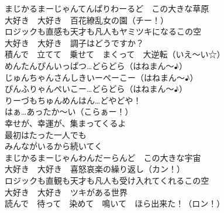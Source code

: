 {まじかるまーじゃんてんぱりわーるど　この大きな草原\\
大好き　大好き　百花繚乱女の園（チー！）\\
ロジックも直感も天才も凡人もヤミツキになるこの空\\
大好き　大好き　調子はどうですか？\\
積んで　立てて　乗せて　まくって　大逆転（いえ〜い☆）\\

めんたんぴんいっぱつ…どらどら（はねまん〜♪）\\
じゅんちゃんさんしきいーぺーこー（はねまん〜♪）\\
ぴんふりゃんぺいこー…どらどら（はねまん〜♪）\\
りーづもちゅんめんはん…どやどや！\\
はぁ…あったか〜い（こらぁー！）\\

幸せが、幸運が、集まってくるよ\\
最初はたった一人でも\\
みんながいるから続いてく\\

まじかるまーじゃんわんだーらんど　この大きな宇宙\\
大好き　大好き　喜怒哀楽の繰り返し（カン！）\\
ロジックも直観も天才も凡人も受け入れてくれるこの空\\
大好き　大好き　ツキがある世界\\
読んで　待って　染めて　鳴いて　ほら出来た！（ロン！）
}

